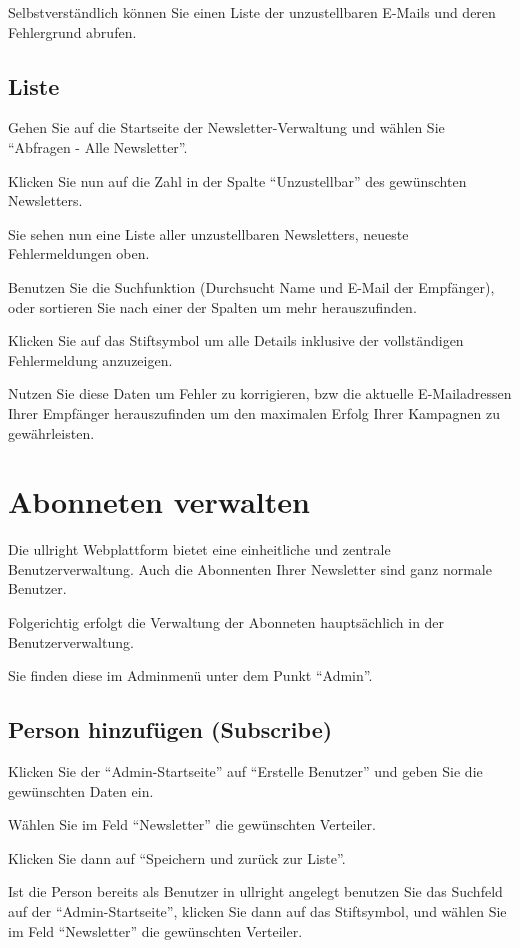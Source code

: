 \documentclass[article, a4paper, oneside, 11pt]{memoir}
\begin{document}
Selbstverständlich können Sie einen Liste der unzustellbaren E-Mails und deren Fehlergrund abrufen.

\section{Liste}

Gehen Sie auf die Startseite der Newsletter-Verwaltung und wählen Sie "`Abfragen - Alle Newsletter"'. 

Klicken Sie nun auf die Zahl in der Spalte "`Unzustellbar"' des gewünschten Newsletters.

Sie sehen nun eine Liste aller unzustellbaren Newsletters, neueste Fehlermeldungen oben.

Benutzen Sie die Suchfunktion (Durchsucht Name und E-Mail der Empfänger), oder sortieren Sie nach einer der Spalten um mehr herauszufinden.

Klicken Sie auf das Stiftsymbol um alle Details inklusive der vollständigen Fehlermeldung anzuzeigen.

Nutzen Sie diese Daten um Fehler zu korrigieren, bzw die aktuelle E-Mailadressen Ihrer Empfänger herauszufinden um den maximalen Erfolg Ihrer Kampagnen zu gewährleisten.


\chapter{Abonneten verwalten}

Die ullright Webplattform bietet eine einheitliche und zentrale Benutzerverwaltung. Auch die Abonnenten Ihrer Newsletter sind ganz normale Benutzer.

Folgerichtig erfolgt die Verwaltung der Abonneten hauptsächlich in der Benutzerverwaltung.

Sie finden diese im Adminmenü unter dem Punkt "`Admin"'.

\section{Person hinzufügen (Subscribe)}

Klicken Sie der "`Admin-Startseite"' auf "`Erstelle Benutzer"' und geben Sie die gewünschten Daten ein.

Wählen Sie im Feld "`Newsletter"' die gewünschten Verteiler.

Klicken Sie dann auf "`Speichern und zurück zur Liste"'.


Ist die Person bereits als Benutzer in ullright angelegt benutzen Sie das Suchfeld auf der "`Admin-Startseite"', klicken Sie dann auf das Stiftsymbol, und wählen Sie im Feld "`Newsletter"' die gewünschten Verteiler.
\end{document}
